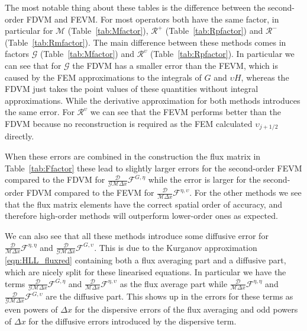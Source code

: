 The most notable thing about these tables is the difference between the second-order FDVM and FEVM. For most operators both have the same factor, in particular for $\mathcal{M}$ (Table~\ref{tab:Mfactor}), $\mathcal{R}^+$ (Table~\ref{tab:Rpfactor}) and $\mathcal{R}^-$ (Table~\ref{tab:Rmfactor}). The main difference between these methods comes in factors $\mathcal{G}$ (Table~\ref{tab:Mfactor}) and $\mathcal{R}^\upsilon$ (Table~\ref{tab:Rpfactor}). In particular we can see that for $\mathcal{G}$ the FDVM has a smaller error than the FEVM, which is caused by the FEM approximations to the integrals of $G$ and $\upsilon H$, whereas the FDVM just takes the point values of these quantities without integral approximations. While the derivative approximation for both methods introduces the same error. For $\mathcal{R}^\upsilon$ we can see that the FEVM performs better than the FDVM because no reconstruction is required as the FEM calculated $\upsilon_{j+1/2}$ directly. 

When these errors are combined in the construction the flux matrix in Table~\ref{tab:Ffactor} these lead to slightly larger errors for the second-order FEVM compared to the FDVM for $\frac{\mathcal{D}}{\mathcal{G}\mathcal{M}\Delta x} \mathcal{F}^{G,\eta}$ while the error is larger for the second-order FDVM compared to the FEVM for $\frac{\mathcal{D}}{\mathcal{M}\Delta x} \mathcal{F}^{\eta,\upsilon}$. For the other methods we see that the flux matrix elements have the correct spatial order of accuracy, and therefore high-order methods will outperform lower-order ones as expected. 

We can also see that all these methods introduce some diffusive error for $ \frac{\mathcal{D}}{\mathcal{M}\Delta x}\mathcal{F}^{\eta,\eta}$ and $\frac{\mathcal{D}}{\mathcal{G}\mathcal{M}\Delta x} \mathcal{F}^{G,\upsilon}$. This is due to the Kurganov approximation \eqref{eqn:HLL_fluxred} containing both a flux averaging part and a diffusive part, which are nicely split for these linearised equations. In particular we have the terms $\frac{\mathcal{D}}{\mathcal{G}\mathcal{M}\Delta x} \mathcal{F}^{G,\eta}$ and $\frac{\mathcal{D}}{\mathcal{M}\Delta x} \mathcal{F}^{\eta,\upsilon}$ as the flux average part while  $\frac{\mathcal{D}}{\mathcal{M}\Delta x}\mathcal{F}^{\eta,\eta}$ and $\frac{\mathcal{D}}{\mathcal{G}\mathcal{M}\Delta x} \mathcal{F}^{G,\upsilon}$ are the diffusive part. This shows up in the errors for these terms as even powers of $\Delta x$ for the dispersive errors of the flux averaging and odd powers of $\Delta x$ for the diffusive errors introduced by the dispersive term.

